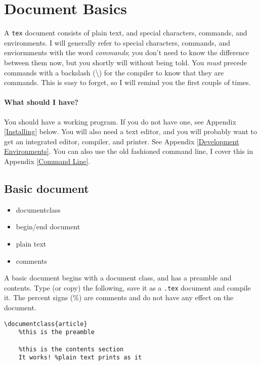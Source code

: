     \section{Document Basics}
    \label{Document-Basics}

    A \texttt{tex} document consists of plain text, and special characters, commands, and environments. I will generally refer to special characters, commands, and enviormments with the word \textit{commands}; you don't need to know the difference between them now, but you shortly will without being told. You \textit{must} precede commands with a backslash (\textbackslash{}) for the compiler to know that they are commands. This is easy to forget, so I will remind you the first couple of times.

	\paragraph{What should I have?}You should have a working \LaTeXe{} program. If you do not have one, see Appendix \ref{Installing} below. You will also need a text editor, and you will probably want to get an integrated editor, compiler, and printer. See Appendix \ref{Development Environments}. You can also use the old fashioned command line, I cover this in Appendix \ref{Command Line}.

        \subsection{Basic document}
        \label{Basic-document}
        
        \begin{framed}
            \begin{itemize}
                \item{documentclass}
                \item{begin/end document}
				\item{plain text}
				\item{comments}
            \end{itemize}
        \end{framed}

        A basic document begins with a document class, and has a preamble and contents. Type (or copy) the following, save it as a \texttt{.tex} document and compile it. The percent signs (\%) are comments and do not have any effect on  the document.

        \begin{verbatim}
\documentclass{article}
    %this is the preamble

    %this is the contents section
    It works! %plain text prints as it
    
        \end{verbatim}

